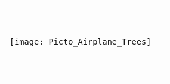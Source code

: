 
\begin{titlepage}
\null\vfill
\begin{center}
\large
\sffamily

\bigskip

{\Large\spacedlowsmallcaps{\myName}} \\

\bigskip

{\huge\spacedlowsmallcaps{\myTitle} \\
}

\bigskip
    
\vspace{9cm}

\begin{tabular} {cc}
\parbox{0.3\textwidth}{\texttt{[image: Picto\_Airplane\_Trees]}}
&
\parbox{0.7\textwidth}{{\Large\spacedlowsmallcaps{\mySubTitle}} \\ 

					{\normalsize
					
					\myGroup \\
					
					\myLocation \\
					\myTime}}
			\end{tabular}
\end{center}
\vfill
\end{titlepage}



